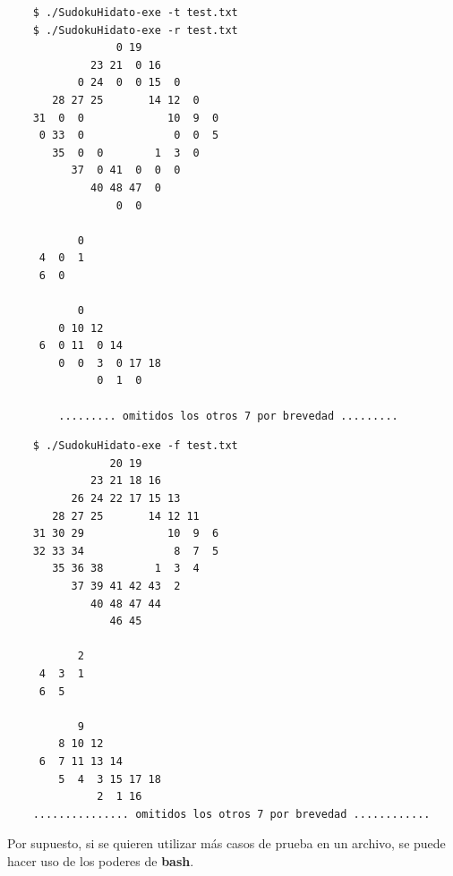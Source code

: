 \documentclass[a4paper, 12pt]{article}
\begin{document}
\begin{verbatim}
    $ ./SudokuHidato-exe -t test.txt
    $ ./SudokuHidato-exe -r test.txt
                 0 19            
             23 21  0 16         
           0 24  0  0 15  0      
       28 27 25       14 12  0   
    31  0  0             10  9  0
     0 33  0              0  0  5
       35  0  0        1  3  0   
          37  0 41  0  0  0      
             40 48 47  0         
                 0  0            

           0
     4  0  1
     6  0   

           0            
        0 10 12         
     6  0 11  0 14      
        0  0  3  0 17 18
              0  1  0   

        ......... omitidos los otros 7 por brevedad .........
\end{verbatim}
\begin{verbatim}
    $ ./SudokuHidato-exe -f test.txt
                20 19            
             23 21 18 16         
          26 24 22 17 15 13      
       28 27 25       14 12 11   
    31 30 29             10  9  6
    32 33 34              8  7  5
       35 36 38        1  3  4   
          37 39 41 42 43  2      
             40 48 47 44         
                46 45            

           2
     4  3  1
     6  5   

           9            
        8 10 12         
     6  7 11 13 14      
        5  4  3 15 17 18
              2  1 16
    ............... omitidos los otros 7 por brevedad ............
\end{verbatim}

Por supuesto, si se quieren utilizar m\'as casos de prueba en un archivo, se puede
hacer uso de los poderes de \textbf{bash}.
\end{document}
